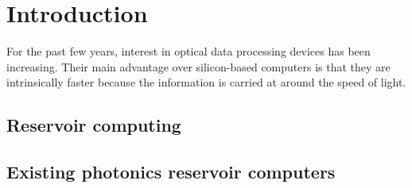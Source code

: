 \chapter{Introduction}

For the past few years, interest in optical data processing devices has been increasing. Their main advantage over silicon-based computers is that they are intrinsically faster because the information is carried at around the speed of light.

\section{Reservoir computing}

\section{Existing photonics reservoir computers}